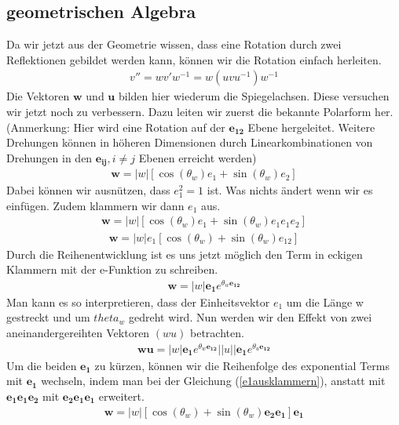 \subsection{geometrischen Algebra}
Da wir jetzt aus der Geometrie wissen, dass eine Rotation durch zwei Reflektionen gebildet werden kann, können wir die Rotation einfach herleiten.
\begin{align} \label{rotGA}
	v'' = wv'w^{-1} = w(uvu^{-1})w^{-1} 
\end{align}
Die Vektoren $\mathbf{w}$ und $\mathbf{u}$ bilden hier wiederum die Spiegelachsen. Diese versuchen wir jetzt noch zu verbessern. Dazu leiten wir zuerst die bekannte Polarform her. (Anmerkung: Hier wird eine Rotation auf der $\mathbf{e_{12}}$ Ebene hergeleitet. Weitere Drehungen können in höheren Dimensionen durch Linearkombinationen von Drehungen in den $\mathbf{e_{ij}}, i\not=j$ Ebenen erreicht werden)
\begin{align}
	\mathbf{w} = |w| \left[\cos(\theta_w) e_1 + \sin(\theta_w) e_2\right]
\end{align}
Dabei können wir ausnützen, dass $e_1^2 = 1$ ist. Was nichts ändert wenn wir es einfügen. Zudem klammern wir dann $e_1$ aus. 
\begin{align}
	\mathbf{w} = |w| \left[\cos(\theta_w) e_1 + \sin(\theta_w) e_1e_1e_2\right] 
\end{align}
\begin{align} \label{e1ausklammern}
	\mathbf{w} = |w|e_1\left[\cos(\theta_w)+ \sin(\theta_w) e_{12}\right]
\end{align}
Durch die Reihenentwicklung ist es uns jetzt möglich den Term in eckigen Klammern mit der e-Funktion zu schreiben.
\begin{align}
	\mathbf{w} = |w|\mathbf{e_1} e^{\theta_w \mathbf{e_{12}}}
\end{align}
Man kann es so interpretieren, dass der Einheitsvektor $e_1$ um die Länge w gestreckt und um $theta_w$ gedreht wird.
Nun werden wir den Effekt von zwei aneinandergereihten Vektoren $(wu)$ betrachten.
\begin{align}
	\mathbf{wu} = |w|\mathbf{e_1} e^{\theta_w \mathbf{e_{12}}}||u||\mathbf{e_1} e^{\theta_u \mathbf{e_{12}}}
\end{align}
Um die beiden $\mathbf{e_1}$ zu kürzen, können wir die Reihenfolge des exponential Terms mit $\mathbf{e_1}$ wechseln, indem man bei der Gleichung (\ref{e1ausklammern}), anstatt mit $\mathbf{e_1e_1e_2}$ mit $\mathbf{e_2e_1e_1}$ erweitert. 
\begin{align} 
	\mathbf{w} = |w|\left[\cos(\theta_w)+ \sin(\theta_w) \mathbf{e_2e_1}\right]\mathbf{e_1}
\end{align}
